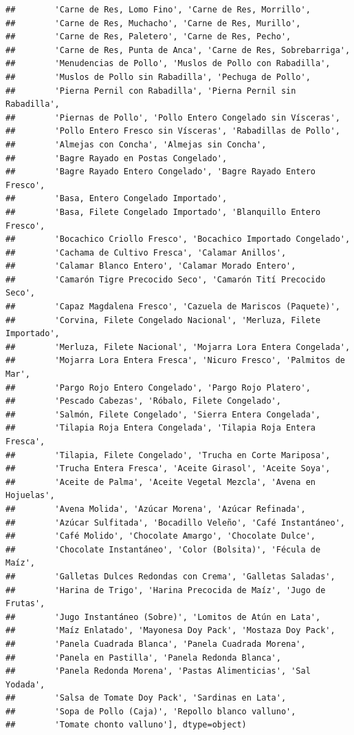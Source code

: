 \documentclass[
]{book}
\begin{document}
\begin{verbatim}
##        'Carne de Res, Lomo Fino', 'Carne de Res, Morrillo',
##        'Carne de Res, Muchacho', 'Carne de Res, Murillo',
##        'Carne de Res, Paletero', 'Carne de Res, Pecho',
##        'Carne de Res, Punta de Anca', 'Carne de Res, Sobrebarriga',
##        'Menudencias de Pollo', 'Muslos de Pollo con Rabadilla',
##        'Muslos de Pollo sin Rabadilla', 'Pechuga de Pollo',
##        'Pierna Pernil con Rabadilla', 'Pierna Pernil sin Rabadilla',
##        'Piernas de Pollo', 'Pollo Entero Congelado sin Vísceras',
##        'Pollo Entero Fresco sin Vísceras', 'Rabadillas de Pollo',
##        'Almejas con Concha', 'Almejas sin Concha',
##        'Bagre Rayado en Postas Congelado',
##        'Bagre Rayado Entero Congelado', 'Bagre Rayado Entero Fresco',
##        'Basa, Entero Congelado Importado',
##        'Basa, Filete Congelado Importado', 'Blanquillo Entero Fresco',
##        'Bocachico Criollo Fresco', 'Bocachico Importado Congelado',
##        'Cachama de Cultivo Fresca', 'Calamar Anillos',
##        'Calamar Blanco Entero', 'Calamar Morado Entero',
##        'Camarón Tigre Precocido Seco', 'Camarón Tití Precocido Seco',
##        'Capaz Magdalena Fresco', 'Cazuela de Mariscos (Paquete)',
##        'Corvina, Filete Congelado Nacional', 'Merluza, Filete Importado',
##        'Merluza, Filete Nacional', 'Mojarra Lora Entera Congelada',
##        'Mojarra Lora Entera Fresca', 'Nicuro Fresco', 'Palmitos de Mar',
##        'Pargo Rojo Entero Congelado', 'Pargo Rojo Platero',
##        'Pescado Cabezas', 'Róbalo, Filete Congelado',
##        'Salmón, Filete Congelado', 'Sierra Entera Congelada',
##        'Tilapia Roja Entera Congelada', 'Tilapia Roja Entera Fresca',
##        'Tilapia, Filete Congelado', 'Trucha en Corte Mariposa',
##        'Trucha Entera Fresca', 'Aceite Girasol', 'Aceite Soya',
##        'Aceite de Palma', 'Aceite Vegetal Mezcla', 'Avena en Hojuelas',
##        'Avena Molida', 'Azúcar Morena', 'Azúcar Refinada',
##        'Azúcar Sulfitada', 'Bocadillo Veleño', 'Café Instantáneo',
##        'Café Molido', 'Chocolate Amargo', 'Chocolate Dulce',
##        'Chocolate Instantáneo', 'Color (Bolsita)', 'Fécula de Maíz',
##        'Galletas Dulces Redondas con Crema', 'Galletas Saladas',
##        'Harina de Trigo', 'Harina Precocida de Maíz', 'Jugo de Frutas',
##        'Jugo Instantáneo (Sobre)', 'Lomitos de Atún en Lata',
##        'Maíz Enlatado', 'Mayonesa Doy Pack', 'Mostaza Doy Pack',
##        'Panela Cuadrada Blanca', 'Panela Cuadrada Morena',
##        'Panela en Pastilla', 'Panela Redonda Blanca',
##        'Panela Redonda Morena', 'Pastas Alimenticias', 'Sal Yodada',
##        'Salsa de Tomate Doy Pack', 'Sardinas en Lata',
##        'Sopa de Pollo (Caja)', 'Repollo blanco valluno',
##        'Tomate chonto valluno'], dtype=object)
\end{verbatim}
\end{document}
